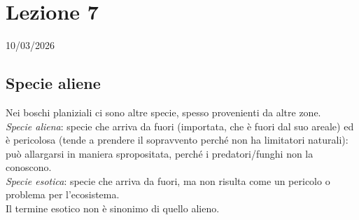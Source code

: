 \section{Lezione 7} \hfill 10/03/2026
\subsection{Specie aliene}
Nei boschi planiziali ci sono altre specie, spesso provenienti da altre zone.\\
\textit{Specie aliena}: specie che arriva da fuori (importata, che è fuori dal suo areale) ed è pericolosa (tende a prendere il sopravvento perché non ha limitatori naturali): può allargarsi in maniera spropositata, perché i predatori/funghi non la conoscono.\\
\textit{Specie esotica}: specie che arriva da fuori, ma non risulta come un pericolo o problema per l'ecosistema.\\
Il termine esotico non è sinonimo di quello alieno.\\
